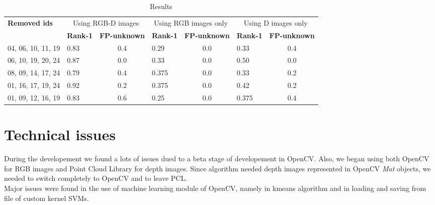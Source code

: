 \documentclass{article}
\begin{document}
\begin{table}[]
	\begin{adjustwidth}{-.75in}{-.75in}
		\centering
		\caption{Results}
		\label{tab:results-rgbd}
		\begin{tabular}{|l|l|c|l|c|l|c|}
			\hline
			\multirow{2}{*}{\bf Removed ids} & \multicolumn{2}{c|}{Using RGB-D images} &\multicolumn{2}{c|}{Using RGB images only} &\multicolumn{2}{c|}{Using D images only} \\ \cline{2-7}
							 & \bf Rank-1 & \bf FP-unknown            & \bf Rank-1 & \bf FP-unknown              & \bf Rank-1 & \bf FP-unknown  \\ \hline
			04, 06, 10, 11, 19               & 0.83	      & 0.4                       & 0.29       & 0.0                         & 0.33       & 0.4\\ \hline
			06, 10, 19, 20, 24               & 0.87	      & 0.0                       & 0.33       & 0.0                         & 0.50       & 0.0\\ \hline
			08, 09, 14, 17, 24               & 0.79	      & 0.4                       & 0.375      & 0.0                         & 0.33       & 0.2\\ \hline
			01, 16, 17, 19, 24               & 0.92	      & 0.2                       & 0.375      & 0.0                         & 0.42       & 0.2\\ \hline
			01, 09, 12, 16, 19               & 0.83	      & 0.6                       & 0.25       & 0.0                         & 0.375      & 0.4\\ \hline
		\end{tabular}
	\end{adjustwidth}
\end{table}

\section{Technical issues}
During the developement we found a lots of issues dued to a beta stage of
developement in OpenCV. Also, we began using both OpenCV for RGB images and
Point Cloud Library for depth images. Since algorithm \citep{Fanelli2011}
needed depth images represented in OpenCV \textit{Mat} objects, we needed to
switch completely to OpenCV and to leave PCL.
\\
Major issues were found in the use of machine learning module of OpenCV, namely
in kmeans algorithm and in loading and saving from file of custom kernel SVMs.

\printbibliography
\end{document}
